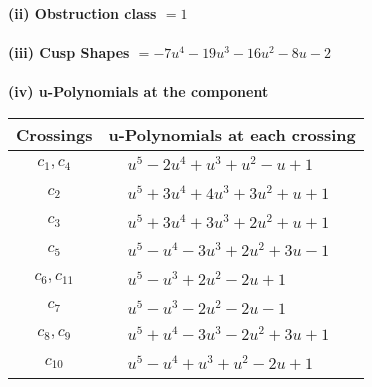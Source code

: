 \documentclass[1p]{elsarticle_modified}
\theoremstyle{definition}
\begin{document}
\flushleft \textbf{(ii) Obstruction class $= 1$}\\~\\
\flushleft \textbf{(iii) Cusp Shapes $= -7 u^4-19 u^3-16 u^2-8 u-2$}\\~\\
\newpage\renewcommand{\arraystretch}{1}
\flushleft \textbf{(iv) u-Polynomials at the component}\newline \\
\begin{tabular}{m{50pt}|m{274pt}}
Crossings & \hspace{64pt}u-Polynomials at each crossing \\
\hline $$\begin{aligned}c_{1},c_{4}\end{aligned}$$&$\begin{aligned}
&u^5-2 u^4+u^3+u^2- u+1
\end{aligned}$\\
\hline $$\begin{aligned}c_{2}\end{aligned}$$&$\begin{aligned}
&u^5+3 u^4+4 u^3+3 u^2+u+1
\end{aligned}$\\
\hline $$\begin{aligned}c_{3}\end{aligned}$$&$\begin{aligned}
&u^5+3 u^4+3 u^3+2 u^2+u+1
\end{aligned}$\\
\hline $$\begin{aligned}c_{5}\end{aligned}$$&$\begin{aligned}
&u^5- u^4-3 u^3+2 u^2+3 u-1
\end{aligned}$\\
\hline $$\begin{aligned}c_{6},c_{11}\end{aligned}$$&$\begin{aligned}
&u^5- u^3+2 u^2-2 u+1
\end{aligned}$\\
\hline $$\begin{aligned}c_{7}\end{aligned}$$&$\begin{aligned}
&u^5- u^3-2 u^2-2 u-1
\end{aligned}$\\
\hline $$\begin{aligned}c_{8},c_{9}\end{aligned}$$&$\begin{aligned}
&u^5+u^4-3 u^3-2 u^2+3 u+1
\end{aligned}$\\
\hline $$\begin{aligned}c_{10}\end{aligned}$$&$\begin{aligned}
&u^5- u^4+u^3+u^2-2 u+1
\end{aligned}$\\
\hline
\end{tabular}\\~\\
\end{document}
